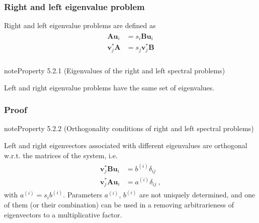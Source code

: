 \documentclass[letterpaper,10pt,english]{jupyterBook}
\begin{document}
\subsubsection{Right and left eigenvalue problem}
\label{\detokenize{ch/linear-algebra/spectral-sensitivity:right-and-left-eigenvalue-problem}}\label{\detokenize{ch/linear-algebra/spectral-sensitivity:math-spectral-sensitivity-first-order-right-left}}
\sphinxAtStartPar
Right and left eigenvalue problems are defined as
\begin{equation}\label{equation:ch/linear-algebra/spectral-sensitivity:eq:eig:right-left}
\begin{split}\begin{aligned}
  \mathbf{A} \mathbf{u}_i & = s_i \mathbf{B} \mathbf{u}_i \\
  \mathbf{v}_j^* \mathbf{A} & = s_j \mathbf{v}_j^* \mathbf{B} \\
\end{aligned}\end{split}
\end{equation}\label{ch/linear-algebra/spectral-sensitivity:property-0}
\begin{sphinxadmonition}{note}{Property 5.2.1 (Eigenvalues of the right and left spectral problems)}



\sphinxAtStartPar
Left and right eigenvalue problems have the same set of eigenvalues.
\end{sphinxadmonition}
\subsubsection*{Proof}

\sphinxAtStartPar
{}
\label{ch/linear-algebra/spectral-sensitivity:property-1}
\begin{sphinxadmonition}{note}{Property 5.2.2 (Orthogonality conditions of right and left spectral problems)}



\sphinxAtStartPar
Left and right eigenvectors associated with different eigenvalues are orthogonal w.r.t. the matrices of the system, i.e.
\begin{equation*}
\begin{split}\begin{aligned}
  \mathbf{v}_j^* \mathbf{B} \mathbf{u}_i & = b^{(i)} \delta_{ij} \\
  \mathbf{v}_j^* \mathbf{A} \mathbf{u}_i & = a^{(i)} \delta_{ij} \ ,
\end{aligned}\end{split}
\end{equation*}
\sphinxAtStartPar
with \(a^{(i)} = s_i b^{(i)}\). Parameters \(a^{(i)}\), \(b^{(i)}\) are not uniquely determined, and one of them (or their combination) can be used in a  removing arbitrarieness of eigenvectors to a multiplicative factor.
\end{sphinxadmonition}
\end{document}
